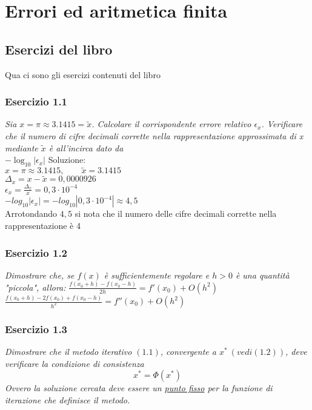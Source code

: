\chapter{Errori ed aritmetica finita}
\section{Esercizi del libro}
Qua ci sono gli esercizi contenuti del libro
\subsection{Esercizio 1.1}
\emph{Sia $ x = \pi \approx 3.1415 = \tilde{x} $. Calcolare il corrispondente errore relativo $\epsilon_{x}$.
Verificare che il numero di cifre decimali corrette nella rappresentazione approssimata di x mediante $\tilde{x}$ è all'incirca dato da}  \\

\center$-\log_{10}|\epsilon_{x}|$
\flushleft Soluzione:\\
\center
$ x = \pi \approx 3.1415, \qquad \tilde{x} = 3.1415 $ \\ \vspace{1ex}
$ \Delta_{x} = x - \tilde{x} = 0,0000926$ \\ \vspace{1ex}
$ \epsilon_{x} = \frac{\Delta_{x}}{x} = 0,3 \cdot 10^{-4} $\\ \vspace{1ex}
$ -log_{10} | \epsilon_{x} | = -log_{10} | 0,3 \cdot 10^{-4} | \approx 4,5  $\\ \vspace{1ex}
\flushleft Arrotondando $ 4,5 $ si nota che il numero delle cifre decimali corrette nella rappresentazione è 4

\subsection{Esercizio 1.2} 
\emph{Dimostrare che, se $f(x)$ è sufficientemente regolare e $ h> 0 $ è una quantità "piccola", allora:}
\center$\frac{f(x_{0}+h)-f(x_{0}-h)}{2h} = f'(x_{0})+O(h^2)$ \\
\vspace{1em}
$\frac{f(x_{0}+h)-2f(x_{0})+f(x_{0}-h)}{h^2} = f''(x_{0})+O(h^2) $
\flushleft

\subsection{Esercizio 1.3} 
\emph{Dimostrare che il metodo iterativo $(1.1) $, convergente a $ x^* \ (vedi(1.2)) $, deve verificare la condizione di consistenza}
$$ x^* =  \Phi(x^*)$$
\emph{Ovvero la soluzione cercata deve essere un \underline{punto fisso} per la funzione di iterazione che definisce il metodo.}

